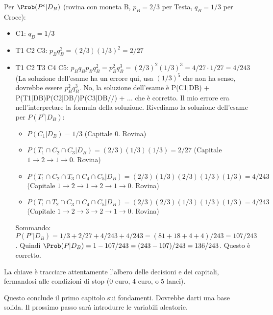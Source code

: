 \begin{example}
Per $\Prob(P^c|D_B)$ (rovina con moneta B, $p_B=2/3$ per Testa, $q_B=1/3$ per Croce):
\begin{itemize}
    \item C1: $q_B = 1/3$
    \item T1 C2 C3: $p_B q_B^2 = (2/3)(1/3)^2 = 2/27$
    \item T1 C2 T3 C4 C5: $p_B q_B p_B q_B^2 = p_B^2 q_B^3 = (2/3)^2 (1/3)^3 = 4/27 \cdot 1/27 = 4/243$ (La soluzione dell'esame ha un errore qui, usa $(1/3)^5$ che non ha senso, dovrebbe essere $p_B^2 q_B^3$. No, la soluzione dell'esame è P(C1|DB) + P(T1|DB)P(C2|DB/)P(C3|DB//) + ... che è corretto. Il mio errore era nell'interpretare la formula della soluzione.
    Rivediamo la soluzione dell'esame per $P(P^c|D_B)$:
    \begin{itemize}
        \item $P(C_1|D_B) = 1/3$ (Capitale 0. Rovina)
        \item $P(T_1 \cap C_2 \cap C_3 | D_B) = (2/3)(1/3)(1/3) = 2/27$ (Capitale $1 \to 2 \to 1 \to 0$. Rovina)
        \item $P(T_1 \cap C_2 \cap T_3 \cap C_4 \cap C_5 | D_B) = (2/3)(1/3)(2/3)(1/3)(1/3) = 4/243$ (Capitale $1 \to 2 \to 1 \to 2 \to 1 \to 0$. Rovina)
        \item $P(T_1 \cap T_2 \cap C_3 \cap C_4 \cap C_5 | D_B) = (2/3)(2/3)(1/3)(1/3)(1/3) = 4/243$ (Capitale $1 \to 2 \to 3 \to 2 \to 1 \to 0$. Rovina)
    \end{itemize}
    Sommando: $P(P^c|D_B) = 1/3 + 2/27 + 4/243 + 4/243 = (81+18+4+4)/243 = 107/243$.
    Quindi $\Prob(P|D_B) = 1 - 107/243 = (243-107)/243 = 136/243$. Questo è corretto.
\end{itemize}
La chiave è tracciare attentamente l'albero delle decisioni e dei capitali, fermandosi alle condizioni di stop (0 euro, 4 euro, o 5 lanci).
\end{example}

Questo conclude il primo capitolo sui fondamenti. Dovrebbe darti una base solida. Il prossimo passo sarà introdurre le variabili aleatorie.



